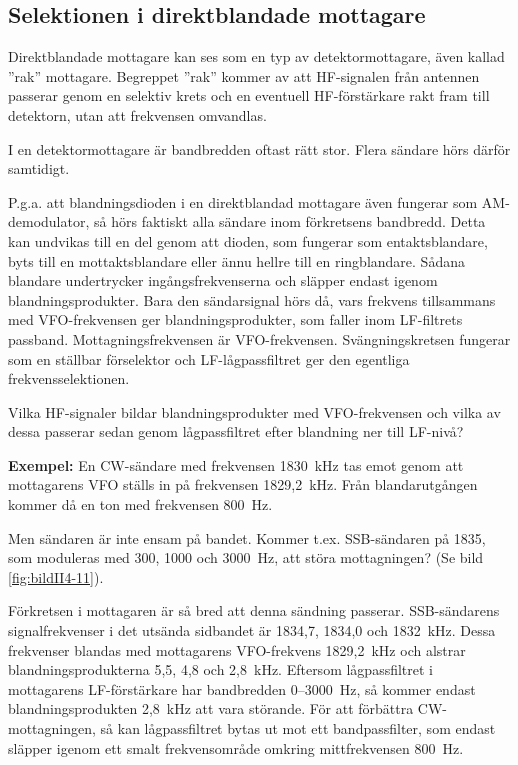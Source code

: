 \subsection{Selektionen i direktblandade mottagare}

Direktblandade mottagare kan ses som en typ av detektormottagare, även
kallad ''rak'' mottagare.
Begreppet ''rak'' kommer av att HF-signalen från antennen passerar genom en
selektiv krets och en eventuell HF-förstärkare rakt fram till detektorn,
utan att frekvensen omvandlas.

I en detektormottagare är bandbredden oftast rätt stor.
Flera sändare hörs därför samtidigt.

P.g.a. att blandningsdioden i en direktblandad mottagare även fungerar
som AM-demodulator, så hörs faktiskt alla sändare inom förkretsens bandbredd.
Detta kan undvikas till en del genom att dioden, som fungerar som
entaktsblandare, byts till en mottaktsblandare eller ännu hellre till en
ringblandare.
Sådana blandare undertrycker ingångsfrekvenserna och släpper endast igenom
blandningsprodukter.
Bara den sändarsignal hörs då, vars frekvens tillsammans med VFO-frekvensen
ger blandningsprodukter, som faller inom LF-filtrets passband.
Mottagningsfrekvensen är VFO-frekvensen.
Svängningskretsen fungerar som en ställbar förselektor och LF-lågpassfiltret
ger den egentliga frekvensselektionen.

Vilka HF-signaler bildar blandningsprodukter med VFO-frekvensen och
vilka av dessa passerar sedan genom lågpassfiltret efter blandning ner
till LF-nivå?

\textbf{Exempel:}
En CW-sändare med frekvensen 1830~kHz tas emot genom att
mottagarens VFO ställs in på frekvensen 1829,2~kHz.
Från blandarutgången kommer då en ton med frekvensen 800~Hz.

Men sändaren är inte ensam på bandet.
Kommer t.ex. SSB-sändaren på 1835, som moduleras med 300, 1000 och 3000~Hz,
att störa mottagningen?
(Se bild \ref{fig:bildII4-11}).

Förkretsen i mottagaren är så bred att denna sändning passerar.
SSB-sändarens signalfrekvenser i det utsända sidbandet är 1834,7, 1834,0 och
1832~kHz.
Dessa frekvenser blandas med mottagarens VFO-frekvens 1829,2~kHz och alstrar
blandningsprodukterna 5,5, 4,8 och 2,8~kHz.
Eftersom lågpassfiltret i mottagarens LF-förstärkare har bandbredden
0--3000~Hz, så kommer endast blandningsprodukten 2,8~kHz att vara störande.
För att förbättra CW-mottagningen, så kan lågpassfiltret bytas ut mot ett
bandpassfilter, som endast släpper igenom ett smalt frekvensområde omkring
mittfrekvensen 800~Hz.

